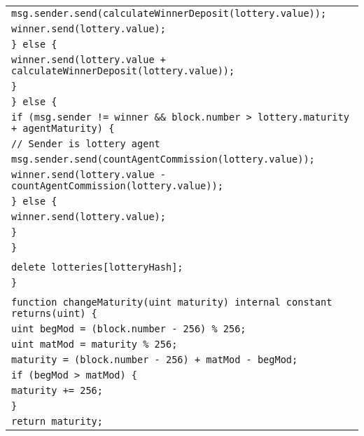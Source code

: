 \documentclass[a4paper]{article}
\begin{document}
\begin{tabularx}{\linewidth}{l}
        \qquad\qquad\qquad\qquad\texttt{msg.sender.send(calculateWinnerDeposit(lottery.value));}\\
        \qquad\qquad\qquad\qquad\texttt{winner.send(lottery.value);}\\
        \qquad\qquad\qquad\texttt{\} else \{}\\
        \qquad\qquad\qquad\qquad\texttt{winner.send(lottery.value + calculateWinnerDeposit(lottery.value));}\\
        \qquad\qquad\qquad\texttt{\}}\\
        \qquad\qquad\texttt{\} else \{}\\
        \qquad\qquad\qquad\texttt{if (msg.sender != winner \&\& block.number > lottery.maturity + agentMaturity) \{}\\
        \qquad\qquad\qquad\qquad\texttt{// Sender is~lottery agent}\\
        \qquad\qquad\qquad\qquad\texttt{msg.sender.send(countAgentCommission(lottery.value));}\\
        \qquad\qquad\qquad\qquad\texttt{winner.send(lottery.value - countAgentCommission(lottery.value));}\\
        \qquad\qquad\qquad\texttt{\} else \{}\\
        \qquad\qquad\qquad\qquad\texttt{winner.send(lottery.value);}\\
        \qquad\qquad\qquad\texttt{\}}\\
        \qquad\qquad\texttt{\}}\\
        \\
        \qquad\qquad\texttt{delete lotteries[lotteryHash];}\\
        \qquad\texttt{\}}\\
        \\
        \qquad\texttt{function changeMaturity(uint maturity) internal constant returns(uint) \{}\\
        \qquad\qquad\texttt{uint begMod = (block.number - 256) \% 256;}\\
        \qquad\qquad\texttt{uint matMod = maturity \% 256;}\\
        \qquad\qquad\texttt{maturity = (block.number - 256) + matMod - begMod;}\\
        \qquad\qquad\texttt{if (begMod > matMod) \{}\\
        \qquad\qquad\qquad\texttt{maturity += 256;}\\
        \qquad\qquad\texttt{\}}\\
        \qquad\qquad\texttt{return maturity;}\\

\end{tabularx}
\end{document}
